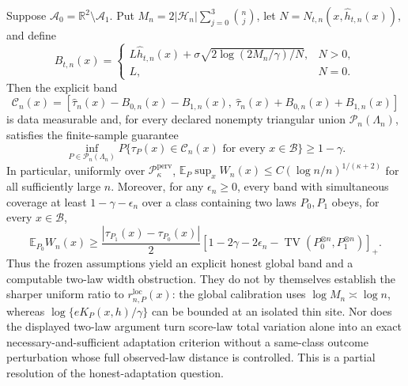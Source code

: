 Suppose \(\mathcal A_0=\mathbb R^2\setminus\mathcal A_1\). Put \(M_n=2|\mathcal H_n|\sum_{j=0}^3\binom nj\), let \(N=N_{t,n}(x,\widehat h_{t,n}(x))\), and define
\[
 B_{t,n}(x)=
 \begin{cases}
 L\widehat h_{t,n}(x)+\sigma\sqrt{2\log(2M_n/\gamma)/N},&N>0,\\
 L,&N=0.
 \end{cases}
\]
Then the explicit band
\[
 \mathcal C_n(x)=
 \left[\widehat\tau_n(x)-B_{0,n}(x)-B_{1,n}(x),\ 
 \widehat\tau_n(x)+B_{0,n}(x)+B_{1,n}(x)\right]
\]
is data measurable and, for every declared nonempty triangular union \(\mathcal P_n(\Lambda_n)\), satisfies the finite-sample guarantee
\[
 \inf_{P\in\mathcal P_n(\Lambda_n)}P\{\tau_P(x)\in\mathcal C_n(x)\text{ for every }x\in\mathcal B\}\ge1-\gamma.
\]
In particular, uniformly over \(\mathcal P_\kappa^{\mathrm{perv}}\), \(\mathbb E_P\sup_x W_n(x)\le C(\log n/n)^{1/(\kappa+2)}\) for all sufficiently large \(n\). Moreover, for any \(\epsilon_n\ge0\), every band with simultaneous coverage at least \(1-\gamma-\epsilon_n\) over a class containing two laws \(P_0,P_1\) obeys, for every \(x\in\mathcal B\),
\[
 \mathbb E_{P_0}W_n(x)\ge\frac{|\tau_{P_1}(x)-\tau_{P_0}(x)|}{2}
 \left[1-2\gamma-2\epsilon_n-
 \operatorname{TV}(P_0^{\otimes n},P_1^{\otimes n})\right]_+.
\]
Thus the frozen assumptions yield an explicit honest global band and a computable two-law width obstruction. They do not by themselves establish the sharper uniform ratio to \(r_{n,P}^{\mathrm{loc}}(x)\): the global calibration uses \(\log M_n\asymp\log n\), whereas \(\log\{eK_P(x,h)/\gamma\}\) can be bounded at an isolated thin site. Nor does the displayed two-law argument turn score-law total variation alone into an exact necessary-and-sufficient adaptation criterion without a same-class outcome perturbation whose full observed-law distance is controlled. This is a partial resolution of the honest-adaptation question.